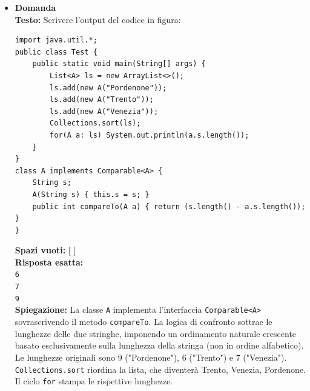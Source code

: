 \documentclass[12pt, a4paper]{article}
\begin{document}
\begin{itemize}
    \item {}\textbf{Domanda \thedomanda} \\
    \textbf{Testo:} Scrivere l'output del codice in figura:
\begin{verbatim}
import java.util.*;
public class Test {
    public static void main(String[] args) {
        List<A> ls = new ArrayList<>();
        ls.add(new A("Pordenone"));
        ls.add(new A("Trento"));
        ls.add(new A("Venezia"));
        Collections.sort(ls);
        for(A a: ls) System.out.println(a.s.length());
    }
}
class A implements Comparable<A> {
    String s;
    A(String s) { this.s = s; }
    public int compareTo(A a) { return (s.length() - a.s.length()); }
}
\end{verbatim}
    \textbf{Spazi vuoti:} [ \hspace{2cm} ] \\
    \textbf{Risposta esatta:} \\
    \texttt{6} \\
    \texttt{7} \\
    \texttt{9} \\
    \textbf{Spiegazione:} La classe \texttt{A} implementa l'interfaccia \texttt{Comparable<A>} sovrascrivendo il metodo \texttt{compareTo}. La logica di confronto sottrae le lunghezze delle due stringhe, imponendo un ordinamento naturale crescente basato esclusivamente sulla lunghezza della stringa (non in ordine alfabetico). Le lunghezze originali sono 9 ("Pordenone"), 6 ("Trento") e 7 ("Venezia"). \texttt{Collections.sort} riordina la lista, che diventerà Trento, Venezia, Pordenone. Il ciclo \texttt{for} stampa le rispettive lunghezze.
    \vspace{0.5cm}

\newpage


\end{itemize}
\end{document}
